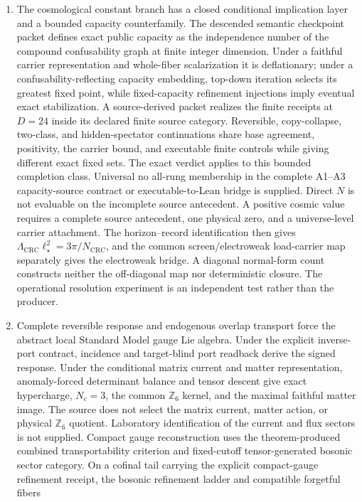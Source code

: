 \begin{enumerate}[leftmargin=2em]
\item The cosmological constant branch has a closed conditional implication
layer and a bounded capacity counterfamily. The descended semantic
checkpoint packet defines exact public capacity as the independence number of
the compound confusability graph at finite integer dimension. Under a faithful
carrier representation and whole-fiber scalarization it is deflationary;
under a confusability-reflecting capacity embedding, top-down iteration selects its
greatest fixed point, while fixed-capacity refinement injections imply
eventual exact stabilization. A source-derived packet realizes the finite
receipts at \(D=24\) inside its declared finite source category. Reversible, copy-collapse, two-class, and
hidden-spectator continuations share base agreement, positivity, the carrier
bound, and executable finite controls while giving different exact fixed
sets. The exact verdict applies to this bounded completion class. Universal
no all-rung membership in the complete A1--A3 capacity-source contract or
executable-to-Lean bridge is supplied. Direct \(N\) is not evaluable on the
incomplete source antecedent. A positive cosmic value requires a complete
source antecedent, one physical zero, and a universe-level carrier attachment.
The horizon--record identification then gives
\(\Lambda_{\mathrm{CRC}}\ell_\star^2=3\pi/N_{\mathrm{CRC}}\), and
the common screen/electroweak load-carrier map separately gives the electroweak bridge. A
diagonal normal-form count constructs neither the off-diagonal map nor
deterministic closure. The operational resolution experiment is an
independent test rather than the producer.
\item Complete reversible response and endogenous overlap transport force the
abstract local Standard Model gauge Lie algebra. Under the explicit
inverse-port contract, incidence and target-blind port readback derive the
signed response. Under the conditional matrix current and matter
representation, anomaly-forced determinant balance and tensor descent give exact hypercharge,
\(N_c=3\), the common \(\mathbb Z_6\) kernel, and the maximal faithful matter
image. The source does not select the matrix current, matter action, or physical
\(\mathbb Z_6\) quotient. Laboratory identification of the
current and flux sectors is not supplied.
Compact gauge reconstruction uses the theorem-produced combined
transportability criterion and fixed-cutoff tensor-generated bosonic sector
category. On a cofinal tail carrying the explicit compact-gauge refinement
receipt, the bosonic refinement ladder and compatible forgetful fibers

\end{enumerate}
